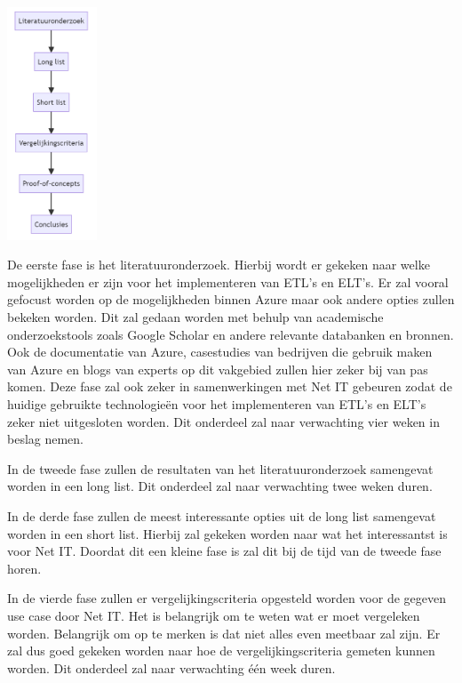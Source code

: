 \begin{center}
    \includegraphics[width=0.2\textwidth]{../voorstel/graphics/methodologie.png}    
\end{center}

De eerste fase is het literatuuronderzoek. Hierbij wordt er gekeken naar welke mogelijkheden er zijn voor het implementeren van ETL's en ELT's. Er zal vooral gefocust worden op de mogelijkheden binnen Azure maar ook andere opties zullen bekeken worden. Dit zal gedaan worden met behulp van academische onderzoekstools zoals Google Scholar en andere relevante databanken en bronnen. Ook de documentatie van Azure, casestudies van bedrijven die gebruik maken van Azure en blogs van experts op dit vakgebied zullen hier zeker bij van pas komen. Deze fase zal ook zeker in samenwerkingen met Net IT gebeuren zodat de huidige gebruikte technologieën voor het implementeren van ETL's en ELT's zeker niet uitgesloten worden. Dit onderdeel zal naar verwachting vier weken in beslag nemen. 

In de tweede fase zullen de resultaten van het literatuuronderzoek samengevat worden in een long list. Dit onderdeel zal naar verwachting twee weken duren.

In de derde fase zullen de meest interessante opties uit de long list samengevat worden in een short list. Hierbij zal gekeken worden naar wat het interessantst is voor Net IT. Doordat dit een kleine fase is zal dit bij de tijd van de tweede fase horen.

In de vierde fase zullen er vergelijkingscriteria opgesteld worden voor de gegeven use case door Net IT. Het is belangrijk om te weten wat er moet vergeleken worden. Belangrijk om op te merken is dat niet alles even meetbaar zal zijn. Er zal dus goed gekeken worden naar hoe de vergelijkingscriteria gemeten kunnen worden. Dit onderdeel zal naar verwachting één week duren.

